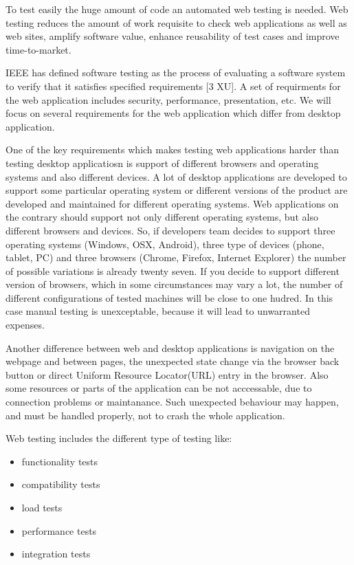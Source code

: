 	 	 To test easily the huge amount of code an automated web testing is needed.	
	 	 Web testing reduces the amount of work requisite to check web applications as well as web sites, amplify software value, enhance
	 	 reusability of test cases and improve time-to-market.
	   
		IEEE has defined software testing as the process of evaluating a software
		system to verify that it satisfies specified requirements [3 XU]. A set of
		requirments for the web application includes security, performance,
		presentation, etc. We will focus on several requirements for the web
		application which differ from desktop application. 
		
		One of the key requirements which makes testing web applications harder than
		testing desktop applicatiosn is support of different browsers and operating systems and also
		different devices. A lot of desktop applications are developed to support some
		particular operating system or different versions of the product are developed
		and maintained for different operating systems. Web applications on the
		contrary should support not only different operating systems, but also
		different browsers and devices. So, if developers team decides to support
		three operating systems (Windows, OSX, Android), three type of devices (phone,
		tablet, PC) and three browsers (Chrome, Firefox, Internet Explorer) the number
		of possible variations is already twenty seven. If you decide to support
		different version of browsers, which in some circumstances may vary a lot,
		the number of different configurations of tested machines will be close to
		one hudred. In this case manual testing is unexceptable, because it will lead
		to unwarranted expenses. 
		
		Another difference between web and desktop applications is
		navigation on the webpage and between pages, the unexpected state change via
		the browser back button or direct Uniform Resource Locator(URL) entry in the
		browser. Also some resources or parts of the application can be not acccessable, due to
		connection problems or maintanance. Such unexpected behaviour may happen, and
		must be handled properly, not to crash the whole application.

		Web testing includes the different type of testing like:
		\begin{itemize}
		  \item functionality tests
		  \item compatibility tests
		  \item load tests
		  \item performance tests
		  \item integration tests
		\end{itemize}


